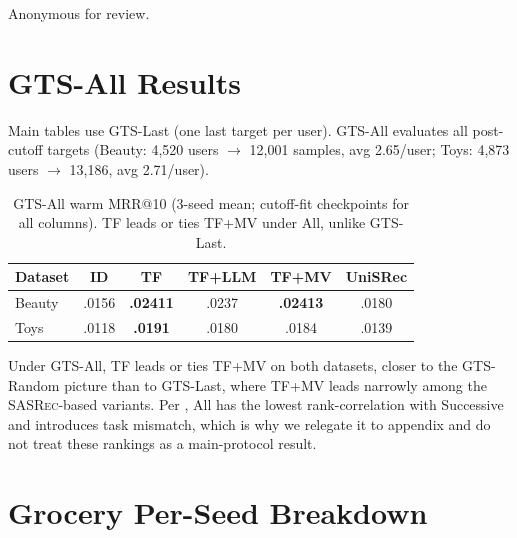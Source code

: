 \documentclass[sigconf,natbib=true,anonymous]{acmart}
\newcommand{\tfmv}{\textsc{TF+MV}\xspace}
\newcommand{\base}{\textsc{SASRec}\xspace}
\begin{document}
\begin{acks}
Anonymous for review.
\end{acks}

\appendix

\section{GTS-All Results}
\label{app:gts-all}

Main tables use GTS-Last (one last target per user).
GTS-All evaluates all post-cutoff targets (Beauty: 4{,}520 users $\to$ 12{,}001 samples, avg 2.65/user; Toys: 4{,}873 users $\to$ 13{,}186, avg 2.71/user).

\begin{table}[h]
\centering
\caption{GTS-All warm MRR@10 (3-seed mean; cutoff-fit checkpoints for all columns).
TF leads or ties \tfmv under All, unlike GTS-Last.}
\label{tab:gts-all}
\small
\begin{tabular}{@{}lccccc@{}}
\toprule
Dataset & ID & TF & TF+LLM & TF+MV & UniSRec \\
\midrule
Beauty & .0156 & \textbf{.02411} & .0237 & \textbf{.02413} & .0180 \\
Toys   & .0118 & \textbf{.0191} & .0180 & .0184 & .0139 \\
\bottomrule
\end{tabular}
\end{table}

Under GTS-All, TF leads or ties \tfmv on both datasets, closer to the GTS-Random picture than to GTS-Last, where \tfmv leads narrowly among the \base-based variants.
Per \citet{gusak2025time}, All has the lowest rank-correlation with Successive and introduces task mismatch, which is why we relegate it to appendix and do not treat these rankings as a main-protocol result.

\section{Grocery Per-Seed Breakdown}
\label{app:grocery}
\end{document}
